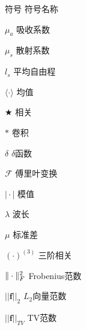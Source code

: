 \begin{englishabstract}
\end{englishabstract}


\XDUpremainmatter

\begin{symbollist}
\item [符号] \hspace{12em} {符号名称}
\item [$\mu_{a}$]\hspace{12.5em} {吸收系数}
\item [$\mu_{s}$]\hspace{12.5em} {散射系数}
\item [$l_{s}$] \hspace{12.5em} {平均自由程}
\item [$\langle \cdot \rangle$] \hspace{12.5em} {均值}
\item [$\bigstar$] \hspace{12.5em} {相关}
\item [$*$] \hspace{12.5em} {卷积}
\item [$\delta$] \hspace{12.5em} {$\delta$函数}
\item [$\mathcal{F}$] \hspace{12.5em} {傅里叶变换}
\item [$\mid \cdot \mid $] \hspace{12.5em} {模值}
\item [$\lambda$] \hspace{12.5em} {波长}
\item [$\mu$] \hspace{12.5em} {标准差}
\item [$(\cdot)^{(3)}$] \hspace{12.5em} {三阶相关}
\item [$\Arrowvert \cdot \Arrowvert_F^{2}$] \hspace{12.5em} {Frobenius范数}
\item [$\vert\vert \mathbf{f}\vert\vert_2  $] \hspace{12.5em} {$L_{2}$向量范数}
\item [$\vert\vert \mathbf{f} \vert\vert_{TV} $] \hspace{12.5em} {TV范数}
\end{symbollist}


